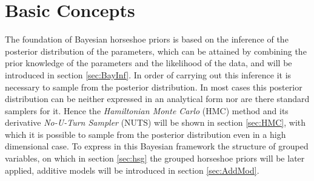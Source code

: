 \documentclass[12pt,letterpaper]{article}
\numberwithin{equation}{subsection}
\begin{document}
\section{Basic Concepts}
\label{sec:basics}
The foundation of Bayesian horseshoe priors is based on the inference of the posterior distribution of the parameters, which can be attained by combining the prior knowledge of the parameters and the likelihood of the data, and will be introduced in section \ref{sec:BayInf}. In order of carrying out this inference it is necessary to sample from the posterior distribution.
In most cases this posterior distribution can be neither expressed in an analytical form nor are there standard samplers for it. Hence the \textit{Hamiltonian Monte Carlo} (HMC) method and its derivative \textit{No-U-Turn Sampler} (NUTS) will be shown in section \ref{sec:HMC}, with which it is possible to sample from the posterior distribution even in a high dimensional case. To express in this Bayesian framework the structure of grouped variables, on which in section \ref{sec:hsg} the grouped horseshoe priors will be later applied,  additive models will be introduced in section \ref{sec:AddMod}.
\end{document}
